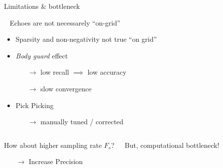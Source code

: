 \begin{frame}{Limitations \& bottleneck  \hfill\faBook}

    \begin{block}{\faExclamationCircle~ Echoes are not necessarely ``on-grid''}

        \vspace{-2mm}
        \begin{itemize}
            \item Sparsity and non-negativity not true ``on grid''

            \item \emph{Body guard} effect \cite{duval2017sparse}
            \begin{itemize}
                \item[$\rightarrow$] low recall $\implies$ low accuracy %
                \item[$\rightarrow$] slow convergence %
            \end{itemize}
            \item Pick Picking
            \begin{itemize}
                \item[$\rightarrow$] manually tuned / corrected
            \end{itemize}
        \end{itemize}
    \end{block}

    \begin{columns}[onlytextwidth]

        \begin{block}{How about higher sampling rate $F_s$?}

            \vspace{-2mm}
            \begin{itemize}
                \item[$\rightarrow$] Increase Precision
            \end{itemize}
        \end{block}

        \begin{block}{But, computational bottleneck!}


\end{block}
\end{columns}
\end{frame}
